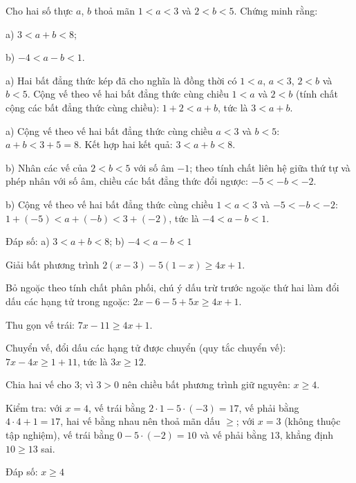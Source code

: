 \begin{problem}[9DS-BPT-035]
Cho hai số thực $a$, $b$ thoả mãn $1 < a < 3$ và $2 < b < 5$. Chứng minh rằng:

a) $3 < a + b < 8$;

b) $-4 < a - b < 1$.

\begin{solution}
a) Hai bất đẳng thức kép đã cho nghĩa là đồng thời có $1 < a$, $a < 3$, $2 < b$ và $b < 5$. Cộng vế theo vế hai bất đẳng thức cùng chiều $1 < a$ và $2 < b$ (tính chất cộng các bất đẳng thức cùng chiều): $1 + 2 < a + b$, tức là $3 < a + b$.

a) Cộng vế theo vế hai bất đẳng thức cùng chiều $a < 3$ và $b < 5$: $a + b < 3 + 5 = 8$. Kết hợp hai kết quả: $3 < a + b < 8$.

b) Nhân các vế của $2 < b < 5$ với số âm $-1$; theo tính chất liên hệ giữa thứ tự và phép nhân với số âm, chiều các bất đẳng thức đổi ngược: $-5 < -b < -2$.

b) Cộng vế theo vế hai bất đẳng thức cùng chiều $1 < a < 3$ và $-5 < -b < -2$: $1 + (-5) < a + (-b) < 3 + (-2)$, tức là $-4 < a - b < 1$.

Đáp số: a) $\boxed{3 < a + b < 8}$; b) $\boxed{-4 < a - b < 1}$
\end{solution}
\end{problem}

\begin{problem}[9DS-BPT-036]
Giải bất phương trình $2(x - 3) - 5(1 - x) \geq 4x + 1$.

\begin{solution}
Bỏ ngoặc theo tính chất phân phối, chú ý dấu trừ trước ngoặc thứ hai làm đổi dấu các hạng tử trong ngoặc: $2x - 6 - 5 + 5x \geq 4x + 1$.

Thu gọn vế trái: $7x - 11 \geq 4x + 1$.

Chuyển vế, đổi dấu các hạng tử được chuyển (quy tắc chuyển vế): $7x - 4x \geq 1 + 11$, tức là $3x \geq 12$.

Chia hai vế cho $3$; vì $3 > 0$ nên chiều bất phương trình giữ nguyên: $x \geq 4$.

Kiểm tra: với $x = 4$, vế trái bằng $2 \cdot 1 - 5 \cdot (-3) = 17$, vế phải bằng $4 \cdot 4 + 1 = 17$, hai vế bằng nhau nên thoả mãn dấu $\geq$; với $x = 3$ (không thuộc tập nghiệm), vế trái bằng $0 - 5 \cdot (-2) = 10$ và vế phải bằng $13$, khẳng định $10 \geq 13$ sai.

Đáp số: $\boxed{x \geq 4}$
\end{solution}
\end{problem}

